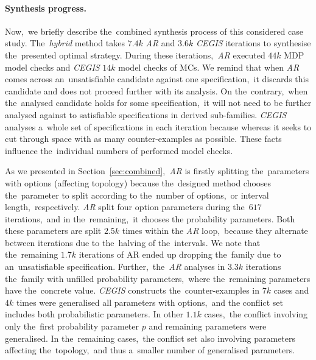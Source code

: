 \paragraph{Synthesis progress.}
Now,~we briefly describe the~combined synthesis process of this considered case study.
The~\textit{hybrid} method takes $7.4k$ \emph{AR} and $3.6k$ \emph{CEGIS} iterations to synthesise the~presented optimal strategy.
During these iterations,~\emph{AR} executed $44k$ MDP model checks and \emph{CEGIS} $14k$ model checks of MCs.
We remind that when \emph{AR} comes across an~unsatisfiable candidate against one specification,~it discards this candidate and does not proceed further with its analysis.
On the~contrary,~when the~analysed candidate holds for some specification,~it will not need to be further analysed against to satisfiable specifications in derived sub-families.
\emph{CEGIS} analyses a~whole set of specifications in each iteration because whereas it seeks to cut through space with as many counter-examples as possible.
These facts influence the~individual numbers of performed model checks.

As we presented in Section~\ref{sec:combined},~\emph{AR} is firstly splitting the~parameters with options (affecting topology) because the~designed method chooses the~parameter to split according to the~number of options,~or interval length,~respectively.
\emph{AR} split four option parameters during the~$617$ iterations,~and in the~remaining,~it chooses the probability parameters.
Both these parameters are split $2.5k$ times within the \emph{AR} loop,~because they alternate between iterations due to the~halving of the~intervals.
We note that the~remaining $1.7k$ iterations of AR ended up dropping the~family due to an~unsatisfiable specification.
Further,~the~\emph{AR} analyses in $3.3k$ iterations the~family with unfilled probability parameters,~where the~remaining parameters have the~concrete value.
\emph{CEGIS} constructs the~counter-examples in $7k$ cases and $4k$ times were generalised all parameters with options,~and the conflict set includes both probabilistic parameters.
In other $1.1k$ cases,~the conflict involving only the~first probability parameter $p$ and remaining parameters were generalised.
In the~remaining cases,~the conflict set also involving parameters affecting the~topology,~and thus a~smaller number of generalised parameters.

